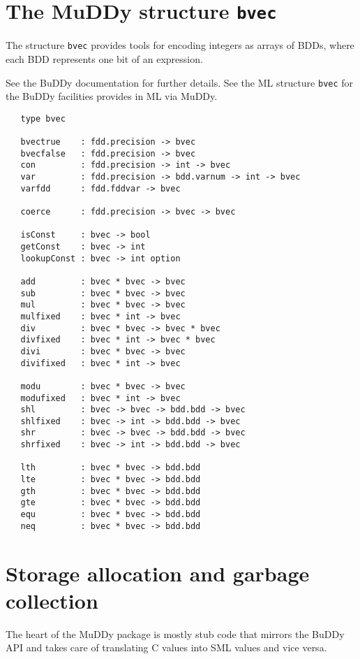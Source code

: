 \documentclass[12pt]{article}
\renewcommand{\t}[1]{\mbox{\tt #1}}
\newcommand{\Buddy}{BuDDy\xspace}
\newcommand{\Muddy}{MuDDy\xspace}
\begin{document}
\section{The \Muddy{} structure \t{bvec}}\label{bvec}

The structure \t{bvec} provides tools for encoding integers as arrays
of BDDs, where each BDD represents one bit of an expression.

See the \Buddy{} documentation \cite{BuDDy} for further details. See the ML structure \t{bvec}
for the \Buddy{} facilities provides in ML via \Muddy{}.

{\tiny
\begin{verbatim}
   type bvec

   bvectrue    : fdd.precision -> bvec 
   bvecfalse   : fdd.precision -> bvec 
   con         : fdd.precision -> int -> bvec
   var         : fdd.precision -> bdd.varnum -> int -> bvec
   varfdd      : fdd.fddvar -> bvec

   coerce      : fdd.precision -> bvec -> bvec

   isConst     : bvec -> bool
   getConst    : bvec -> int
   lookupConst : bvec -> int option

   add         : bvec * bvec -> bvec
   sub         : bvec * bvec -> bvec
   mul         : bvec * bvec -> bvec
   mulfixed    : bvec * int -> bvec
   div         : bvec * bvec -> bvec * bvec
   divfixed    : bvec * int -> bvec * bvec
   divi        : bvec * bvec -> bvec
   divifixed   : bvec * int -> bvec

   modu        : bvec * bvec -> bvec
   modufixed   : bvec * int -> bvec
   shl         : bvec -> bvec -> bdd.bdd -> bvec
   shlfixed    : bvec -> int -> bdd.bdd -> bvec
   shr         : bvec -> bvec -> bdd.bdd -> bvec
   shrfixed    : bvec -> int -> bdd.bdd -> bvec

   lth         : bvec * bvec -> bdd.bdd
   lte         : bvec * bvec -> bdd.bdd
   gth         : bvec * bvec -> bdd.bdd
   gte         : bvec * bvec -> bdd.bdd
   equ         : bvec * bvec -> bdd.bdd
   neq         : bvec * bvec -> bdd.bdd
\end{verbatim}}

\section{Storage allocation and garbage collection}
\label{sec:technical-details}

The heart of the \Muddy package is mostly stub code that mirrors the
\Buddy API and takes care of translating C values into SML values and
vice versa.
\end{document}
